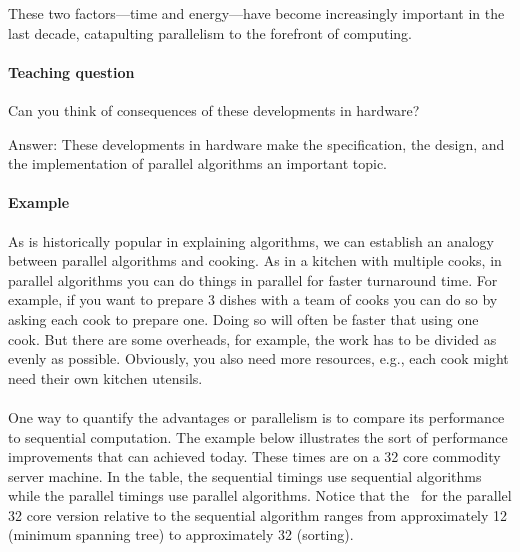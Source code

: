 These two factors---time and energy---have become increasingly
important in the last decade, catapulting parallelism to the forefront
of computing.

\paragraph{Teaching question}
Can you think of consequences of these developments in hardware?  

Answer:
These developments in hardware make the specification, the design, and
the implementation of parallel algorithms an important topic.

\paragraph{Example}
As is historically popular in explaining algorithms, we can establish
an analogy between parallel algorithms and cooking.  As in a kitchen
with multiple cooks, in parallel algorithms you can do things in
parallel for faster turnaround time.  For example, if you want to
prepare 3 dishes with a team of cooks you can do so by asking each
cook to prepare one.
%
Doing so will often be faster that using one cook.  But there are some
overheads, for example, the work has to be divided as evenly as
possible.  Obviously, you also need more resources, e.g., each cook
might need their own kitchen utensils.

\paragraph{}
One way to quantify the advantages or parallelism is to compare
its performance to sequential computation.
%
The example below illustrates the sort of performance improvements
that can achieved today.  
%
%
These times are on a 32 core commodity
server machine.  In the table, the sequential timings use sequential
algorithms while the parallel timings use parallel algorithms.  Notice
that the~ for the parallel 32 core version relative to
the sequential algorithm ranges from approximately 12 (minimum
spanning tree) to approximately 32 (sorting).

